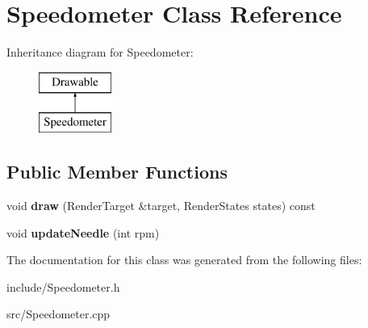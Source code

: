 \hypertarget{class_speedometer}{}\section{Speedometer Class Reference}
\label{class_speedometer}
Inheritance diagram for Speedometer\+:\begin{figure}[H]
\begin{center}
\leavevmode
\includegraphics[height=2.000000cm]{class_speedometer}
\end{center}
\end{figure}
\subsection*{Public Member Functions}
\begin{DoxyCompactItemize}
\item 
\hypertarget{class_speedometer_a63f86cc7a6ebc117ade6b5b5e7fcae63}{}void {\bfseries draw} (Render\+Target \&target, Render\+States states) const \label{class_speedometer_a63f86cc7a6ebc117ade6b5b5e7fcae63}

\item 
\hypertarget{class_speedometer_a78c6e203740df6c6f2bcc629a244cc35}{}void {\bfseries update\+Needle} (int rpm)\label{class_speedometer_a78c6e203740df6c6f2bcc629a244cc35}

\end{DoxyCompactItemize}


The documentation for this class was generated from the following files\+:\begin{DoxyCompactItemize}
\item 
include/Speedometer.\+h\item 
src/Speedometer.\+cpp\end{DoxyCompactItemize}
